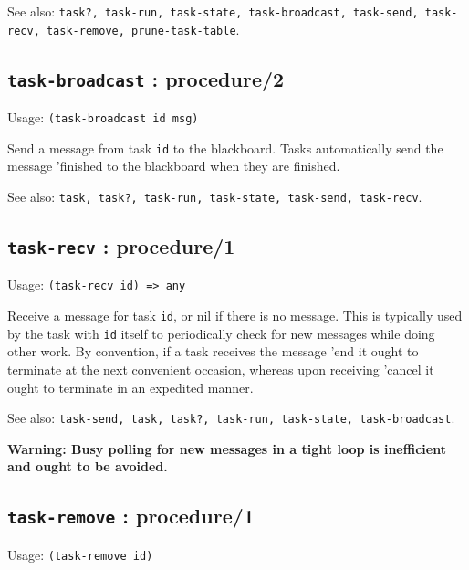 \documentclass[
]{article}
\newcommand{\passthrough}[1]{#1}
\begin{document}
See also:
\passthrough{\lstinline!task?, task-run, task-state, task-broadcast, task-send, task-recv, task-remove, prune-task-table!}.

\hypertarget{task-broadcast-procedure2-1}{%
\subsection{\texorpdfstring{\texttt{task-broadcast} :
procedure/2}{task-broadcast : procedure/2}}\label{task-broadcast-procedure2-1}}

Usage: \passthrough{\lstinline!(task-broadcast id msg)!}

Send a message from task \passthrough{\lstinline!id!} to the blackboard.
Tasks automatically send the message 'finished to the blackboard when
they are finished.

See also:
\passthrough{\lstinline!task, task?, task-run, task-state, task-send, task-recv!}.

\hypertarget{task-recv-procedure1-1}{%
\subsection{\texorpdfstring{\texttt{task-recv} :
procedure/1}{task-recv : procedure/1}}\label{task-recv-procedure1-1}}

Usage: \passthrough{\lstinline!(task-recv id) => any!}

Receive a message for task \passthrough{\lstinline!id!}, or nil if there
is no message. This is typically used by the task with
\passthrough{\lstinline!id!} itself to periodically check for new
messages while doing other work. By convention, if a task receives the
message 'end it ought to terminate at the next convenient occasion,
whereas upon receiving 'cancel it ought to terminate in an expedited
manner.

See also:
\passthrough{\lstinline!task-send, task, task?, task-run, task-state, task-broadcast!}.

\textbf{Warning: Busy polling for new messages in a tight loop is
inefficient and ought to be avoided.}

\hypertarget{task-remove-procedure1-1}{%
\subsection{\texorpdfstring{\texttt{task-remove} :
procedure/1}{task-remove : procedure/1}}\label{task-remove-procedure1-1}}

Usage: \passthrough{\lstinline!(task-remove id)!}
\end{document}
